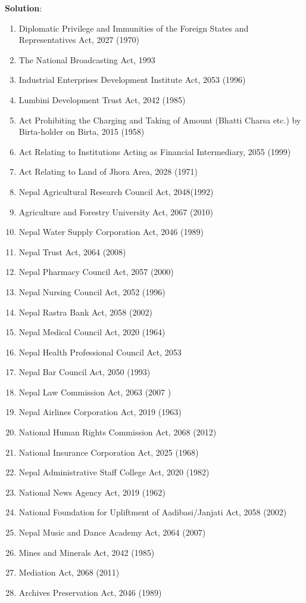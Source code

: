 \documentclass[
  openany]{book}
\newenvironment{solution}{ {\bfseries Solution}:}{}
\begin{document}
\begin{questions}
\begin{solution}
\begin{enumerate}
\item Diplomatic Privilege and Immunities of the Foreign States and Representatives Act, 2027 (1970)
\item The National Broadcasting Act, 1993
\item Industrial Enterprises Development Institute Act, 2053 (1996)
\item Lumbini Development Trust Act, 2042 (1985)
\item Act Prohibiting the Charging and Taking of Amount (Bhatti Charsa etc.) by Birta-holder on Birta, 2015 (1958)
\item Act Relating to Institutions Acting as Financial Intermediary, 2055 (1999)
\item Act Relating to Land of Jhora Area, 2028 (1971)
\item Nepal Agricultural Research Council Act, 2048(1992)
\item Agriculture and Forestry University Act, 2067 (2010)
\item Nepal Water Supply Corporation Act, 2046 (1989)
\item Nepal Trust Act, 2064 (2008)
\item Nepal Pharmacy Council Act, 2057 (2000)
\item Nepal Nursing Council Act, 2052 (1996)
\item Nepal Rastra Bank Act, 2058 (2002)
\item Nepal Medical Council Act, 2020 (1964)
\item Nepal Health Professional Council Act, 2053
\item Nepal Bar Council Act, 2050 (1993)
\item Nepal Law Commission Act, 2063 (2007 )
\item Nepal Airlines Corporation Act, 2019 (1963)
\item National Human Rights Commission Act, 2068 (2012)
\item National Insurance Corporation Act, 2025 (1968)
\item Nepal Administrative Staff College Act, 2020 (1982)
\item National News Agency Act, 2019 (1962)
\item National Foundation for Upliftment of Aadibasi/Janjati Act, 2058 (2002)
\item Nepal Music and Dance Academy Act, 2064 (2007)
\item Mines and Minerals Act, 2042 (1985)
\item Mediation Act, 2068 (2011)
\item Archives Preservation Act, 2046 (1989)

\end{enumerate}
\end{solution}
\end{questions}
\end{document}
